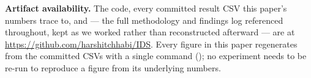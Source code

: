 \textbf{Artifact availability.} The code, every committed result CSV this paper's numbers trace
to, and  — the full methodology and findings log referenced throughout, kept
as we worked rather than reconstructed afterward — are at
\url{https://github.com/harshitchhabi/IDS}. Every figure in this paper regenerates from the
committed CSVs with a single command (); no experiment
needs to be re-run to reproduce a figure from its underlying numbers.
